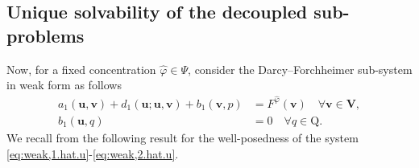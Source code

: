 \documentclass[11pt, reqno, a4paper, twoside]{article}
\newcommand{\bu}{\boldsymbol{u}}
\newcommand{\bv}{\boldsymbol{v}}
\newcommand{\rQ}{\mathrm{Q}}
\newcommand{\bV}{\mathbf{V}}
\numberwithin{equation}{section}
\numberwithin{remark}{section}
\numberwithin{figure}{section}
\numberwithin{table}{section}
\begin{document}
\subsection{Unique solvability of the decoupled sub-problems}
Now, for a fixed concentration $\hat{\varphi}\in \Psi$, consider the Darcy--Forchheimer sub-system in weak form as follows
\begin{subequations}\label{eq:weak.fixed.u.hat}
    \begin{align}
    a_1(\bu,\bv) + d_1(\bu; \bu,\bv) +  b_1(\bv,p) & = F^{\hat\varphi}(\bv) \quad \forall \bv \in \bV,\label{eq:weak,1.hat.u}\\
    b_1(\bu,q) & = 0 \quad \forall q \in \rQ.\label{eq:weak,2.hat.u}
    \end{align}
\end{subequations}
We recall from \cite[Theorem~3.3]{dhpr_sinum26} the following result for the well-posedness of the system \eqref{eq:weak,1.hat.u}-\eqref{eq:weak,2.hat.u}.
\end{document}
